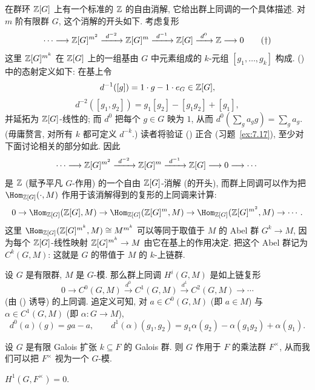 在群环 $\mathbb{Z}[G]$ 上有一个标准的 $\mathbb{Z}$ 的自由消解, 它给出群上同调的一个具体描述. 对 $m$ 阶有限群 $G$, 这个消解的开头如下. 考虑复形
\begin{equation*}
\cdots \longrightarrow \mathbb{Z}[G]^{m^2} \xrightarrow{\ d^{-2}\ } \mathbb{Z}[G]^m \xrightarrow{\ d^{-1}\ } \mathbb{Z}[G] \xrightarrow{\ d^0\ } \mathbb{Z} \longrightarrow 0\tag{\dag}
\end{equation*}
这里 $\mathbb{Z}[G]^{m^k}$ 在 $\mathbb{Z}[G]$ 上的一组基由 $G$ 中元素组成的 $k$-元组 $[g_1,\dots,g_k]$ 构成. (\dag) 中的态射定义如下: 在基上令
\[
d^{-1}([g]) = 1\cdot g-1\cdot e_G\in \mathbb{Z}[G],
\]
\[
d^{-2}([g_1,g_2]) = g_1[g_2]-[g_1g_2]+[g_1],
\]
并延拓为 $\mathbb{Z}[G]$-线性的; 而 $d^0$ 把每个 $g\in G$ 映为 $1$, 从而 $d^0(\sum_g a_g g)=\sum_g a_g$. (毋庸赘言, 对所有 $k$ 都可定义 $d^{-k}$.) 读者将验证 (\dag) 正合 (习题~\ref{ex:7.17}), 至少对下面讨论相关的部分如此. 因此
\[
\cdots \longrightarrow \mathbb{Z}[G]^{m^2} \xrightarrow{\ d^{-2}\ } \mathbb{Z}[G]^m \xrightarrow{\ d^{-1}\ } \mathbb{Z}[G] \longrightarrow 0 \longrightarrow \cdots
\]
是 $\mathbb{Z}$ (赋予平凡 $G$-作用) 的一个自由 $\mathbb{Z}[G]$-消解 (的开头), 而群上同调可以作为把 $\Hom_{\ZZ[G]}(\cdot,M)$ 作用于该消解得到的复形的上同调来计算:
\[
0\to \Hom_{\ZZ[G]}(\ZZ[G],M)\to \Hom_{\ZZ[G]}(\ZZ[G]^m,M)\to \Hom_{\ZZ[G]}(\ZZ[G]^{m^2},M)\to\cdots.
\]
这里 $\Hom_{\ZZ[G]}(\ZZ[G]^{m^k},M)\cong M^{m^k}$ 可以等同于取值于 $M$ 的 Abel 群 $G^k\to M$, 因为每个 $\mathbb{Z}[G]$-线性映射 $\mathbb{Z}[G]^{m^k}\to M$ 由它在基上的作用决定. 把这个 Abel 群记为 $C^k(G,M)$: 这就是 $G$ 的带值于 $M$ 的 $k$-上链群.

\begin{proposition}\label{prop:7.16-group-cohomology}
设 $G$ 是有限群, $M$ 是 $G$-模. 那么群上同调 $H^i(G,M)$ 是如上链复形
\[
0\to C^0(G,M)\xrightarrow{\ d^0\ }C^1(G,M)\xrightarrow{\ d^1\ }C^2(G,M)\to\cdots
\]
(由 (\dag) 诱导) 的上同调. 追定义可知, 对 $a\in C^0(G,M)$ (即 $a\in M$) 与 $\alpha\in C^1(G,M)$ (即 $\alpha:G\to M$),
\[
d^0(a)(g)=g a-a,\qquad d^1(\alpha)(g_1,g_2)=g_1\alpha(g_2)-\alpha(g_1g_2)+\alpha(g_1).
\]
\end{proposition}

\begin{example}\label{ex:7.17-hilbert90}
设 $G$ 是有限 Galois 扩张 $k\subseteq F$ 的 Galois 群. 则 $G$ 作用于 $F$ 的乘法群 $F^\times$, 从而我们可以把 $F^\times$ 视为一个 $G$-模.
\end{example}

\begin{proposition}\label{prop:7.18-hilbert90}
$H^1(G,F^\times)=0$.
\end{proposition}

